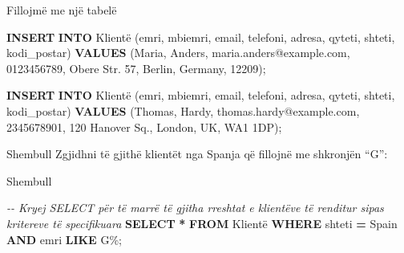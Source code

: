 \documentclass[
  ignorenonframetext,
]{beamer}
\newenvironment{Shaded}{\begin{snugshade}}{\end{snugshade}}
\newcommand{\CommentTok}[1]{\textcolor[rgb]{0.56,0.35,0.01}{\textit{#1}}}
\newcommand{\KeywordTok}[1]{\textcolor[rgb]{0.13,0.29,0.53}{\textbf{#1}}}
\newcommand{\NormalTok}[1]{#1}
\newcommand{\OperatorTok}[1]{\textcolor[rgb]{0.81,0.36,0.00}{\textbf{#1}}}
\newcommand{\StringTok}[1]{\textcolor[rgb]{0.31,0.60,0.02}{#1}}
\begin{document}
\begin{frame}[fragile]{Fillojmë me një tabelë}
\begin{Shaded}
\begin{Highlighting}[]
\KeywordTok{INSERT} \KeywordTok{INTO}\NormalTok{ Klientë (emri, mbiemri, email, telefoni, adresa, qyteti, shteti, kodi\_postar)}
\KeywordTok{VALUES}\NormalTok{ (}\StringTok{\textquotesingle{}Maria\textquotesingle{}}\NormalTok{, }\StringTok{\textquotesingle{}Anders\textquotesingle{}}\NormalTok{, }\StringTok{\textquotesingle{}maria.anders@example.com\textquotesingle{}}\NormalTok{, }\StringTok{\textquotesingle{}0123456789\textquotesingle{}}\NormalTok{, }\StringTok{\textquotesingle{}Obere Str. 57\textquotesingle{}}\NormalTok{, }\StringTok{\textquotesingle{}Berlin\textquotesingle{}}\NormalTok{, }\StringTok{\textquotesingle{}Germany\textquotesingle{}}\NormalTok{, }\StringTok{\textquotesingle{}12209\textquotesingle{}}\NormalTok{);}

\KeywordTok{INSERT} \KeywordTok{INTO}\NormalTok{ Klientë (emri, mbiemri, email, telefoni, adresa, qyteti, shteti, kodi\_postar)}
\KeywordTok{VALUES}\NormalTok{ (}\StringTok{\textquotesingle{}Thomas\textquotesingle{}}\NormalTok{, }\StringTok{\textquotesingle{}Hardy\textquotesingle{}}\NormalTok{, }\StringTok{\textquotesingle{}thomas.hardy@example.com\textquotesingle{}}\NormalTok{, }\StringTok{\textquotesingle{}2345678901\textquotesingle{}}\NormalTok{, }\StringTok{\textquotesingle{}120 Hanover Sq.\textquotesingle{}}\NormalTok{, }\StringTok{\textquotesingle{}London\textquotesingle{}}\NormalTok{, }\StringTok{\textquotesingle{}UK\textquotesingle{}}\NormalTok{, }\StringTok{\textquotesingle{}WA1 1DP\textquotesingle{}}\NormalTok{);}
\end{Highlighting}
\end{Shaded}
\end{frame}

\begin{frame}{Shembull}
\label{shembull-21}
Zgjidhni të gjithë klientët nga Spanja që fillojnë me shkronjën ``G'':
\end{frame}

\begin{frame}[fragile]{Shembull}
\label{shembull-22}

\begin{Shaded}
\begin{Highlighting}[]
\CommentTok{{-}{-} Kryej SELECT për të marrë të gjitha rreshtat e klientëve të renditur sipas kritereve të specifikuara}
\KeywordTok{SELECT} \OperatorTok{*} 
\KeywordTok{FROM}\NormalTok{ Klientë}
\KeywordTok{WHERE}\NormalTok{ shteti }\OperatorTok{=} \StringTok{\textquotesingle{}Spain\textquotesingle{}} \KeywordTok{AND}\NormalTok{ emri }\KeywordTok{LIKE} \StringTok{\textquotesingle{}G\%\textquotesingle{}}\NormalTok{;}
\end{Highlighting}
\end{Shaded}
\end{frame}
\end{document}
